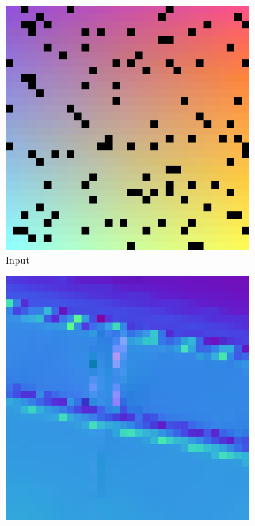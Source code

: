 \begin{figure}
\begin{subfigure}[b]{0.24\linewidth}
	\end{subfigure}	
	
	\begin{subfigure}[b]{0.24\linewidth}
		\includegraphics[width=\linewidth]{./Figures/gcnn_synthetic/eval_9_input.png}
		\caption{Input}
	\end{subfigure}
	\begin{subfigure}[b]{0.24\linewidth}
		\includegraphics[width=\linewidth]{./Figures/gcnn_synthetic/eval_9_normal_GT.png}

\end{subfigure}
\end{figure}

